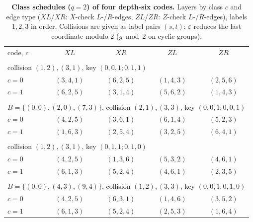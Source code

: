 \documentclass[reprint,twocolumn,superscriptaddress,nofootinbib]{revtex4-2}
\theoremstyle{plain}
\begin{document}
\begin{table}[!t]
\caption{\textbf{Class schedules ($q=2$) of four depth-six codes.} Layers
by class $c$ and edge type ($XL$/$XR$: $X$-check $L$-/$R$-edges, $ZL$/$ZR$:
$Z$-check $L$-/$R$-edges), labels $1,2,3$ in order. Collisions are given
as label pairs $(s,t)$; $\varepsilon$ reduces the last coordinate modulo
$2$ ($g\bmod2$ on cyclic groups).}
\label{tab:templates-more}
\begin{ruledtabular}
\begin{tabular}{lcccc}
code, $c$ & $XL$ & $XR$ & $ZL$ & $ZR$ \\
\colrule
\multicolumn{5}{l}{$[[108,12,6]]$: $\mathbb{Z}_{54}$, $A=\{0,6,39\}$, $B=\{0,39,51\}$,}\\
\multicolumn{5}{l}{\quad collision $(1,2),(3,1)$, key $(0,0,1;0,1,1)$}\\
$c=0$ & $(3,4,1)$ & $(6,2,5)$ & $(1,4,3)$ & $(2,5,6)$ \\
$c=1$ & $(6,2,5)$ & $(3,1,4)$ & $(5,6,2)$ & $(1,4,3)$ \\
\colrule
\multicolumn{5}{l}{$[[108,4,\le12]]$: $\mathbb{Z}_9\times\mathbb{Z}_6$, $A=\{(0,0),(5,4),(7,1)\}$,}\\
\multicolumn{5}{l}{\quad $B=\{(0,0),(2,0),(7,3)\}$, collision $(2,1),(3,3)$, key $(0,0,1;0,0,1)$}\\
$c=0$ & $(4,2,5)$ & $(3,6,1)$ & $(6,1,4)$ & $(5,2,3)$ \\
$c=1$ & $(1,6,3)$ & $(2,5,4)$ & $(3,2,5)$ & $(6,4,1)$ \\
\colrule
\multicolumn{5}{l}{$[[144,12,\le8]]$: $\mathbb{Z}_{72}$, $A=\{0,3,51\}$, $B=\{0,51,66\}$,}\\
\multicolumn{5}{l}{\quad collision $(1,2),(3,1)$, key $(0,1,1;0,1,0)$}\\
$c=0$ & $(4,2,5)$ & $(1,3,6)$ & $(5,3,2)$ & $(4,6,1)$ \\
$c=1$ & $(6,1,3)$ & $(5,2,4)$ & $(4,6,1)$ & $(2,3,5)$ \\
\colrule
\multicolumn{5}{l}{$[[144,8,\le10]]$: $\mathbb{Z}_{12}\times\mathbb{Z}_6$, $A=\{(0,0),(1,0),(7,5)\}$,}\\
\multicolumn{5}{l}{\quad $B=\{(0,0),(4,3),(9,4)\}$, collision $(1,2),(3,3)$, key $(0,0,1;0,1,0)$}\\
$c=0$ & $(4,2,5)$ & $(6,3,1)$ & $(1,4,6)$ & $(3,5,2)$ \\
$c=1$ & $(6,1,3)$ & $(5,2,4)$ & $(2,5,3)$ & $(1,6,4)$ \\
\end{tabular}
\end{ruledtabular}
\end{table}
\end{document}
